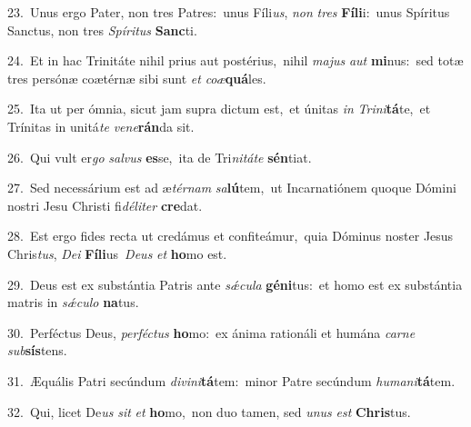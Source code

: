 {\numbfont\textcolor{\numbcolor}{23.}}~Unus ergo Pater, non tres Patres:~\dagger unus Fíli\-\textit{us}\-, \textit{non} \textit{tres} \textbf{Fí}\-\textbf{li}i:~\star unus Spíritus Sanctus, non tres \textit{Spí}\-\textit{ri}\textit{tus} \textbf{Sanc}\-ti.\par
{\numbfont\textcolor{\numbcolor}{24.}}~Et in hac Trinitáte nihil prius aut postérius,~\dagger nihil \textit{ma}\-\textit{jus} \textit{aut} \textbf{mi}\-nus:~\star sed totæ tres persónæ coætérnæ sibi sunt \textit{et} \textit{co}\-\textit{æ}\textbf{quá}les.\par
{\numbfont\textcolor{\numbcolor}{25.}}~Ita ut per ómnia, sicut jam supra dictum est,~\dagger et únitas \textit{in} \textit{Tri}\-\textit{ni}\textbf{tá}te,~\star et Trínitas in unitá\textit{te} \textit{ve}\-\textit{ne}\textbf{rán}da sit.\par
{\numbfont\textcolor{\numbcolor}{26.}}~Qui vult er\textit{go} \textit{sal}\-\textit{vus} \textbf{es}\-se,~\star ita de Tri\-\textit{ni}\-\textit{tá}\textit{te} \textbf{sén}\-tiat.\par
{\numbfont\textcolor{\numbcolor}{27.}}~Sed necessárium est ad æ\-\textit{tér}\-\textit{nam} \textit{sa}\-\textbf{lú}tem,~\star ut Incarnatiónem quoque Dómini nostri Jesu Christi fi\-\textit{dé}\-\textit{li}\textit{ter} \textbf{cre}\-dat.\par
{\numbfont\textcolor{\numbcolor}{28.}}~Est ergo fides recta ut credámus et confiteámur,~\dagger quia Dóminus noster Jesus Chris\-\textit{tus}\-, \textit{De}\-\textit{i} \textbf{Fí}\-\textbf{li}us~\star \textit{De}\-\textit{us} \textit{et} \textbf{ho}\-mo est.\par
{\numbfont\textcolor{\numbcolor}{29.}}~Deus est ex substántia Patris ante \textit{sǽ}\-\textit{cu}\textit{la} \textbf{gé}\-\textbf{ni}tus:~\star et homo est ex substántia matris in \textit{sǽ}\-\textit{cu}\textit{lo} \textbf{na}\-tus.\par
{\numbfont\textcolor{\numbcolor}{30.}}~Perféctus Deus, \textit{per}\-\textit{féc}\textit{tus} \textbf{ho}\-mo:~\star ex ánima rationáli et humána \textit{car}\-\textit{ne} \textit{sub}\-\textbf{sís}tens.\par
{\numbfont\textcolor{\numbcolor}{31.}}~Æquális Patri secúndum \textit{di}\-\textit{vi}\textit{ni}\textbf{tá}tem:~\star minor Patre secúndum \textit{hu}\-\textit{ma}\textit{ni}\textbf{tá}tem.\par
{\numbfont\textcolor{\numbcolor}{32.}}~Qui, licet De\textit{us} \textit{sit} \textit{et} \textbf{ho}\-mo,~\star non duo tamen, sed \textit{u}\-\textit{nus} \textit{est} \textbf{Chris}\-tus.\par

